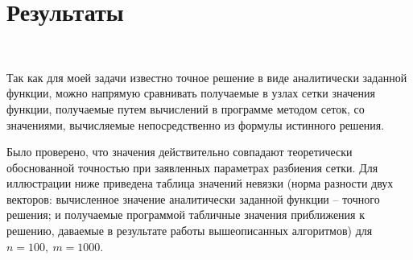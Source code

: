 \documentclass[12pt,a4paper]{article}
\begin{document}
\section{Результаты}

\

Так как для моей задачи известно точное решение в виде аналитически заданной функции, можно напрямую сравнивать получаемые в узлах сетки значения функции, получаемые путем вычислений в программе методом сеток, со значениями, вычисляемые непосредственно из формулы истинного решения.

Было проверено, что значения действительно совпадают теоретически обоснованной точностью при заявленных параметрах разбиения сетки. Для иллюстрации ниже приведена таблица значений невязки (норма разности двух векторов: вычисленное значение аналитически заданной функции -- точного решения; и получаемые программой табличные значения приближения к решению, даваемые в результате работы вышеописанных алгоритмов) для $n=100, \ m=1000$. 
\end{document}

